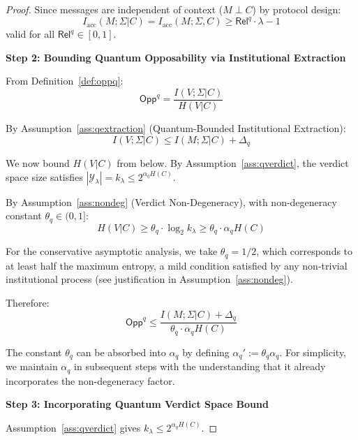 \documentclass{ieeeaccess}
\newcommand{\Rel}{\mathsf{Rel}}
\newcommand{\Opp}{\mathsf{Opp}}
\begin{document}
\begin{proof}
Since messages are independent of context ($M \perp C$) by 
protocol design:
\begin{equation}
    I_{\mathrm{acc}}(M; \Sigma|C) = I_{\mathrm{acc}}(M; \Sigma, C) 
    \geq \Rel^q \cdot \lambda - 1
    \label{eq:iacc_lower}
\end{equation}
valid for all $\Rel^q \in [0,1]$.

\textbf{Step 2: Bounding Quantum Opposability via Institutional Extraction}

From Definition~\ref{def:oppq}:
\begin{equation}
    \Opp^q = \frac{I(V; \Sigma|C)}{H(V|C)}
\end{equation}

By Assumption~\ref{ass:qextraction} (Quantum-Bounded Institutional Extraction):
\begin{equation}
    I(V; \Sigma|C) \leq I(M; \Sigma|C) + \Delta_q
\end{equation}

We now bound $H(V|C)$ from below. By Assumption~\ref{ass:qverdict}, the verdict space size satisfies $|\mathcal{Y}_\lambda| = k_\lambda \leq 2^{\alpha_q H(C)}$. 

By Assumption~\ref{ass:nondeg} (Verdict Non-Degeneracy), with non-degeneracy constant $\theta_q \in (0,1]$:
\begin{equation}
    H(V|C) \geq \theta_q \cdot \log_2 k_\lambda \geq \theta_q \cdot \alpha_q H(C)
\end{equation}

For the conservative asymptotic analysis, we take $\theta_q = 1/2$, which corresponds to at least half the maximum entropy,  a mild condition satisfied by any non-trivial institutional process (see justification in Assumption~\ref{ass:nondeg}).

Therefore:
\begin{equation}
\label{eq:opp_bound}
    \Opp^q \leq \frac{I(M;\Sigma|C) + \Delta_q}{\theta_q \cdot \alpha_q H(C)}
\end{equation}

The constant $\theta_q$ can be absorbed into $\alpha_q$ by defining $\alpha_q' := \theta_q \alpha_q$. For simplicity, we maintain $\alpha_q$ in subsequent steps with the understanding that it already incorporates the non-degeneracy factor.

\textbf{Step 3: Incorporating Quantum Verdict Space Bound}

Assumption~\ref{ass:qverdict} gives $k_\lambda \leq 2^{\alpha_q H(C)}$.


\end{proof}
\end{document}
